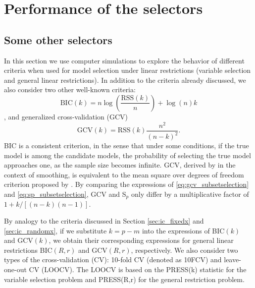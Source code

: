 \section{Performance of the selectors}
\label{sec:simulation}
\subsection{Some other selectors}
In this section we use computer simulations to explore the behavior of different criteria when used for model selection under linear restrictions (variable selection and general linear restrictions). In addition to the criteria already discussed, we also consider two other well-known criteria: 
\begin{equation*}
\text{BIC}(k) = n \log\left( \frac{\text{RSS}(k)}{n} \right) +\log(n) k
\end{equation*}
\citep{schwarz1978estimating}, and generalized cross-validation (GCV)
\begin{equation}
\text{GCV}(k) = \text{RSS}(k)\frac{n^2}{(n-k)^2}.
\label{eq:gcv_subsetselection}
\end{equation}
BIC is a consistent criterion, in the sense that under some conditions, if the true model is among the candidate models, the probability of selecting the true model approaches one, as the sample size becomes infinite. GCV, derived by \citet{craven1978smoothing} in the context of smoothing, is equivalent to the mean square over degrees of freedom criterion proposed by \citet{tukey1967discussion}. By comparing the expressions of \eqref{eq:gcv_subsetselection} and \eqref{eq:sp_subsetselection}, GCV and S$_p$ only differ by a multiplicative factor of $1 + k / [(n-k)(n-1)]$.

By analogy to the criteria discussed in Section \ref{sec:ic_fixedx} and \ref{sec:ic_randomx}, if we substitute $k=p-m$ into the expressions of BIC$(k)$ and GCV$(k)$, we obtain their corresponding expressions for general linear restrictions BIC$(R,r)$ and GCV$(R,r)$, respectively. We also consider two types of the cross-validation (CV): 10-fold CV (denoted as 10FCV) and leave-one-out CV (LOOCV). The LOOCV is based on the PRESS(k) statistic for the variable selection problem and PRESS(R,r) for the general restriction problem.


